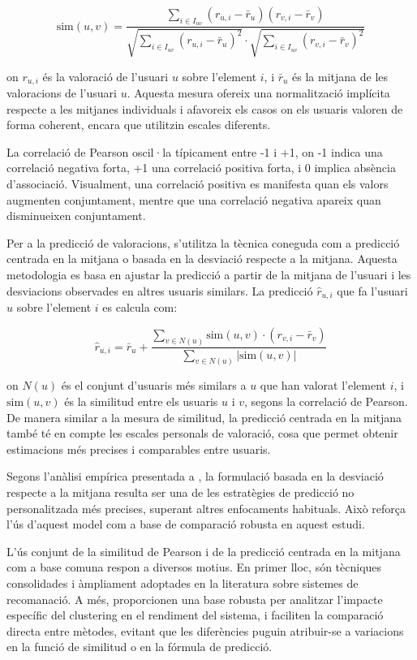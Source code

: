 \documentclass[a4paper,12pt]{report}
\begin{document}
\[
\text{sim}(u,v) = \frac{\sum_{i \in I_{uv}} (r_{u,i} - \bar{r}_u)(r_{v,i} - \bar{r}_v)}{\sqrt{\sum_{i \in I_{uv}} (r_{u,i} - \bar{r}_u)^2} \cdot \sqrt{\sum_{i \in I_{uv}} (r_{v,i} - \bar{r}_v)^2}}
\]

on \( r_{u,i} \) és la valoració de l’usuari \( u \) sobre l’element \( i \), i \( \bar{r}_u \) és la mitjana de les valoracions de l’usuari \( u \). Aquesta mesura ofereix una normalització implícita respecte a les mitjanes individuals i afavoreix els casos on els usuaris valoren de forma coherent, encara que utilitzin escales diferents.

La correlació de Pearson oscil·la típicament entre -1 i +1, on -1 indica una correlació negativa forta, +1 una correlació positiva forta, i 0 implica absència d’associació. Visualment, una correlació positiva es manifesta quan els valors augmenten conjuntament, mentre que una correlació negativa apareix quan disminueixen conjuntament.

Per a la predicció de valoracions, s’utilitza la tècnica coneguda com a predicció centrada en la mitjana o basada en la desviació respecte a la mitjana. Aquesta metodologia es basa en ajustar la predicció a partir de la mitjana de l’usuari i les desviacions observades en altres usuaris similars. La predicció \( \hat{r}_{u,i} \) que fa l’usuari \( u \) sobre l’element \( i \) es calcula com:

\[
\hat{r}_{u,i} = \bar{r}_u + \frac{\sum_{v \in N(u)} \text{sim}(u,v) \cdot (r_{v,i} - \bar{r}_v)}{\sum_{v \in N(u)} |\text{sim}(u,v)|}
\]

on \( N(u) \) és el conjunt d’usuaris més similars a \( u \) que han valorat l’element \( i \), i \( \text{sim}(u,v) \) és la similitud entre els usuaris \( u \) i \( v \), segons la correlació de Pearson. De manera similar a la mesura de similitud, la predicció centrada en la mitjana també té en compte les escales personals de valoració, cosa que permet obtenir estimacions més precises i comparables entre usuaris.

Segons l’anàlisi empírica presentada a \cite{herlocker2002empirical}, la formulació basada en la desviació respecte a la mitjana resulta ser una de les estratègies de predicció no personalitzada més precises, superant altres enfocaments habituals. Això reforça l’ús d’aquest model com a base de comparació robusta en aquest estudi.

L’ús conjunt de la similitud de Pearson i de la predicció centrada en la mitjana com a base comuna respon a diversos motius. En primer lloc, són tècniques consolidades i àmpliament adoptades en la literatura sobre sistemes de recomanació. A més, proporcionen una base robusta per analitzar l’impacte específic del clustering en el rendiment del sistema, i faciliten la comparació directa entre mètodes, evitant que les diferències puguin atribuir-se a variacions en la funció de similitud o en la fórmula de predicció.
\end{document}
